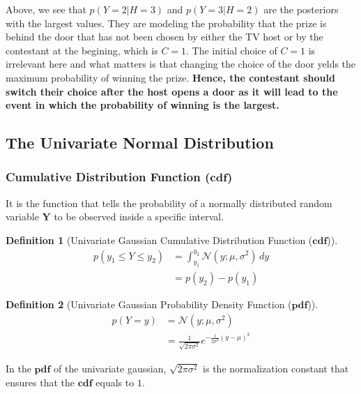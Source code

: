\documentclass{article}
\newtheorem{definition}{Definition}[section]
\begin{document}
\begin{question}
	Above, we see that $p(Y = 2 | H = 3)$ and $p(Y = 3 | H = 2)$ are the posteriors with the largest values. They are modeling the probability that the prize is behind the door that has not been chosen by either the TV host or by the contestant at the begining, which is $C = 1$. The initial choice of $C=1$ is irrelevant here and what matters is that changing the choice of the door yelds the maximum probability of winning the prize.  \textbf{Hence, the contestant should switch their choice after the host opens a door as it will lead to the event in which the probability of winning is the largest. }
\end{question}




\subsection{The Univariate Normal Distribution}


\subsubsection{Cumulative Distribution  Function ($\mathbf{cdf}$)}

It is the function that tells the probability of a normally distributed random variable $\mathbf{Y}$ to be observed inside a specific interval.

\begin{definition}[Univariate Gaussian Cumulative Distribution  Function ($\mathbf{cdf}$)]
	\begin{align}
		p(y_1 \leq Y  \leq y_2) &=  \int_{y_1}^{y_2}  \mathcal{N}(y; \mu, \sigma^2) \, dy \\
											   &= p(y_2) - p(y_1)
	\end{align}
\end{definition}


\begin{definition}[Univariate Gaussian Probability Density  Function ($\mathbf{pdf}$)]
	\begin{align}
		p(Y = y) &=  \mathcal{N}(y; \mu, \sigma^2) \\
					   &= \frac{1}{\sqrt{2\pi\sigma^2}}e^{-\frac{1}{2\sigma^2}(y - \mu)^2}
	\end{align}
\end{definition}

In the $\mathbf{pdf}$ of the univariate gaussian, $\sqrt{2\pi\sigma^2}$ is the normalization constant that ensures that the $\mathbf{cdf}$ equals to $1$.
\end{document}

